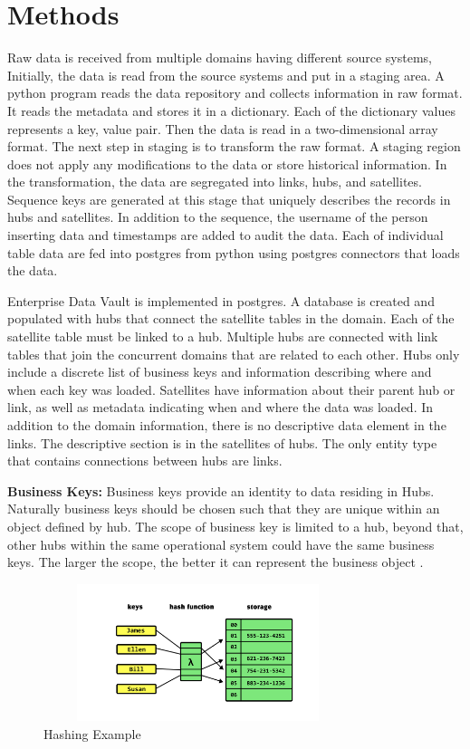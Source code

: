 \documentclass[conference]{IEEEtran}
\begin{document}
\section{Methods}

Raw data is received from multiple domains having different source systems, Initially, the data is read from the source systems and put in a staging area. A python program reads the data repository and collects information in raw format. It reads the metadata and stores it in a dictionary. Each of the dictionary values represents a key, value pair. Then the data is read in a two-dimensional array format. The next step in staging is to transform the raw format. A staging region does not apply any modifications to the data or store historical information. In the transformation, the data are segregated into links, hubs, and satellites. Sequence keys are generated at this stage that uniquely describes the records in hubs and satellites. In addition to the sequence, the username of the person inserting data and timestamps are added to audit the data. Each of individual table data are fed into postgres from python using postgres connectors that loads the data.

Enterprise Data Vault is implemented in postgres. A database is created and populated with hubs that connect the satellite tables in the domain. Each of the satellite table must be linked to a hub. Multiple hubs are connected with link tables that join the concurrent domains that are related to each other. Hubs only include a discrete list of business keys and information describing where and when each key was loaded. Satellites have information about their parent hub or link, as well as metadata indicating when and where the data was loaded. In addition to the domain information, there is no descriptive data element in the links. The descriptive section is in the satellites of hubs. The only entity type that contains connections between hubs are links.

\smallskip
\noindent
\textbf{Business Keys:} Business keys provide an identity to data residing in Hubs. Naturally business keys should be chosen such that they are unique within an object defined by hub. The scope of business key is limited to a hub, beyond that, other hubs within the same operational system could have the same business keys. The larger the scope, the better it can represent the business object \cite{b4}.

\begin{figure}[htbp]
\centerline{\includegraphics[width=9cm, height=4cm]{Figure4.png}}
\caption{Hashing Example}
\label{fig4}
\end{figure}
\end{document}
